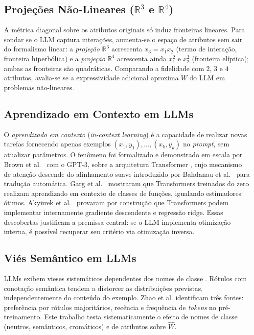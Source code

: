 \documentclass[12pt,a4paper]{article}
\newcommand{\West}{\ensuremath{\hat{W}}}   %
\begin{document}
\subsection{Projeções Não-Lineares (\texorpdfstring{$\mathbb{R}^3$ e $\mathbb{R}^4$}{R3 e R4})}
\label{sec:r3r4}

A métrica diagonal sobre os atributos originais só induz fronteiras lineares. Para
sondar se o LLM captura interações, aumenta-se o espaço de atributos sem sair do
formalismo linear: a \emph{projeção $\mathbb{R}^3$} acrescenta $x_3 = x_1 x_2$ (termo de
interação, fronteira hiperbólica) e a \emph{projeção $\mathbb{R}^4$} acrescenta ainda
$x_1^2$ e $x_2^2$ (fronteira
elíptica); ambas as fronteiras são quadráticas. Comparando a fidelidade com
$2$, $3$ e $4$ atributos, avalia-se se a expressividade adicional aproxima \West{} do
LLM em problemas não-lineares.

\subsection{Aprendizado em Contexto em LLMs}

O \emph{aprendizado em contexto} (\emph{in-context learning}) é a capacidade de realizar
novas tarefas fornecendo apenas
exemplos $(x_1,y_1),\ldots,(x_k,y_k)$ no \emph{prompt}, sem atualizar parâmetros. O
fenômeno foi formalizado e demonstrado em escala por Brown et
al.~\cite{brownLanguageModels2020} com o GPT-3, sobre a arquitetura Transformer
\cite{vaswaniAttention2017}, cujo mecanismo de atenção descende do alinhamento suave
introduzido por Bahdanau et al.~\cite{bahdanauNeuralMachine2015} para tradução
automática. Garg et
al.~\cite{gargWhatTransformers2022} mostraram que Transformers treinados do zero realizam
aprendizado em contexto de classes de funções, igualando estimadores ótimos. Akyürek et
al.~\cite{akyurekWhatLearning2023} provaram por construção que Transformers podem implementar
internamente gradiente descendente e regressão ridge. Essas descobertas justificam a premissa
central: se o LLM implementa otimização interna, é possível recuperar seu critério via
otimização inversa.

\subsection{Viés Semântico em LLMs}

LLMs exibem vieses sistemáticos dependentes dos nomes de classe
\cite{zhaoCalibrateBefore2021}. Rótulos com conotação semântica tendem a distorcer as
distribuições previstas, independentemente do conteúdo do exemplo. Zhao et al. identificam
três fontes: preferência por rótulos majoritários, recência e frequência de \emph{tokens}
no pré-treinamento. Este trabalho testa sistematicamente o efeito de nomes de classe
(neutros, semânticos, cromáticos) e de atributos sobre \West{}.
\end{document}
